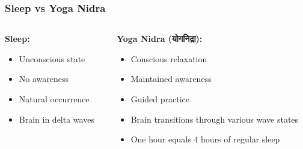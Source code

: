 \begin{frame}[fragile]\frametitle{Sleep vs Yoga Nidra}
    \begin{columns}
        \begin{column}{0.48\textwidth}
            \textbf{Sleep:}
            \begin{itemize}
                \item Unconscious state
                \item No awareness
                \item Natural occurrence
                \item Brain in delta waves
            \end{itemize}
        \end{column}
        \begin{column}{0.48\textwidth}
            \textbf{Yoga Nidra (योगनिद्रा):}
            \begin{itemize}
                \item Conscious relaxation
                \item Maintained awareness
                \item Guided practice
                \item Brain transitions through various wave states
                \item One hour equals 4 hours of regular sleep
            \end{itemize}
        \end{column}
    \end{columns}
\end{frame}


